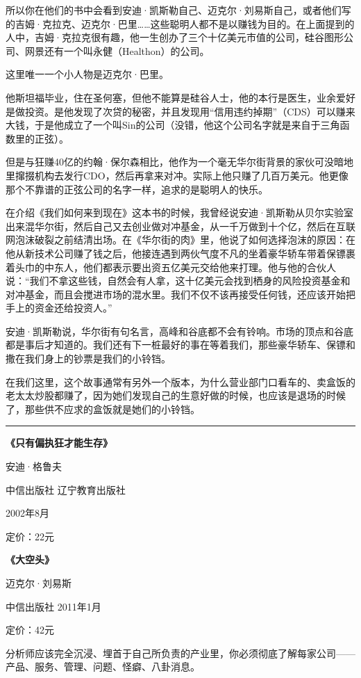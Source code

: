 所以你在他们的书中会看到安迪·凯斯勒自己、迈克尔·刘易斯自己，或者他们写的吉姆·克拉克、迈克尔·巴里\ldots\ldots 这些聪明人都不是以赚钱为目的。在上面提到的人中，吉姆·克拉克很有趣，他一生创办了三个十亿美元市值的公司，硅谷图形公司、网景还有一个叫永健（Healthon）的公司。

这里唯一一个小人物是迈克尔·巴里。

他斯坦福毕业，住在圣何塞，但他不能算是硅谷人士，他的本行是医生，业余爱好是做投资。是他发现了次贷的秘密，并且发现用``信用违约掉期''（CDS）可以赚来大钱，于是他成立了一个叫Sin的公司（没错，他这个公司名字就是来自于三角函数里的正弦）。

但是与狂赚40亿的约翰·保尔森相比，他作为一个毫无华尔街背景的家伙可没暗地里撺掇机构去发行CDO，然后再拿来对冲。实际上他只赚了几百万美元。他更像那个不靠谱的正弦公司的名字一样，追求的是聪明人的快乐。

在介绍《我们如何来到现在》这本书的时候，我曾经说安迪·凯斯勒从贝尔实验室出来混华尔街，然后自己又去创业做对冲基金，从一千万做到十个亿，然后在互联网泡沫破裂之前结清出场。在《华尔街的肉》里，他说了如何选择泡沫的原因：在他从新技术公司赚了钱之后，他接连遇到两伙气度不凡的坐着豪华轿车带着保镖裹着头巾的中东人，他们都表示要出资五亿美元交给他来打理。他与他的合伙人说：``我们不拿这些钱，自然会有人拿，这十亿美元会找到栖身的风险投资基金和对冲基金，而且会搅进市场的混水里。我们不仅不该再接受任何钱，还应该开始把手上的资金还给投资人。''

安迪·凯斯勒说，华尔街有句名言，高峰和谷底都不会有铃响。市场的顶点和谷底都是事后才知道的。我们还有下一桩最好的事在等着我们，那些豪华轿车、保镖和撒在我们身上的钞票是我们的小铃铛。

在我们这里，这个故事通常有另外一个版本，为什么营业部门口看车的、卖盒饭的老太太炒股都赚了，因为她们发现自己的生意好做的时候，也应该是退场的时候了，那些供不应求的盒饭就是她们的小铃铛。

\begin{center}\rule{0.5\linewidth}{0.5pt}\end{center}

\textbf{《只有偏执狂才能生存》}

安迪·格鲁夫

中信出版社 辽宁教育出版社

2002年8月

定价：22元

\textbf{《大空头》}

迈克尔·刘易斯

中信出版社 2011年1月

定价：42元

分析师应该完全沉浸、埋首于自己所负责的产业里，你必须彻底了解每家公司------产品、服务、管理、问题、怪癖、八卦消息。

